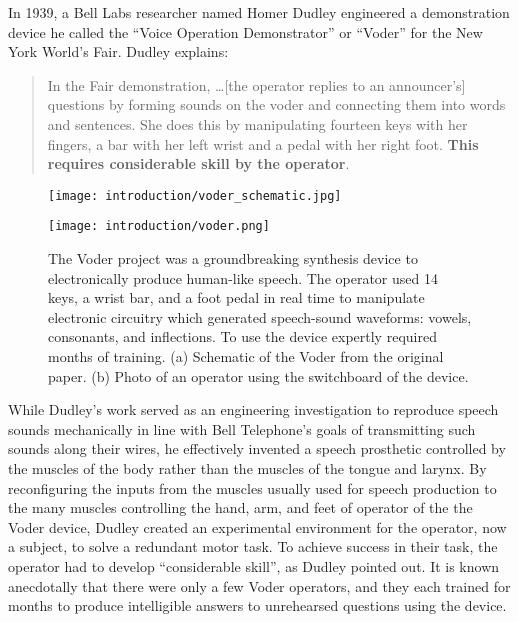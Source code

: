 \documentclass[../main.tex]{subfiles}
\begin{document}
In 1939, a Bell Labs researcher named Homer Dudley engineered a demonstration device he called the ``Voice Operation Demonstrator'' or ``Voder'' for the New York World's Fair\cite{dudleyAutomaticSynthesisSpeech1939}. Dudley explains:
%
\begin{quote}
  In the Fair demonstration, \ldots [the operator replies to an announcer's] questions by forming sounds on the voder and connecting them into words and sentences. She does this by manipulating fourteen keys with her fingers, a bar with her left wrist and a pedal with her right foot. \textbf{This requires considerable skill by the operator}.
\end{quote}
%
\begin{figure}
  \centering
  \begin{minipage}{0.59\textwidth}
    \texttt{[image: introduction/voder\_schematic.jpg]}
    \subcaption{}
  \end{minipage}
  \begin{minipage}{0.4\textwidth}
    \texttt{[image: introduction/voder.png]}
    \subcaption{}
  \end{minipage}
  \caption[The Voder at the 1939 World's Fair]{The Voder project was a groundbreaking synthesis device to electronically produce human-like speech. The operator used 14 keys, a wrist bar, and a foot pedal in real time to manipulate electronic circuitry which generated speech-sound waveforms: vowels, consonants, and inflections. To use the device expertly required months of training. (a) Schematic of the Voder from the original paper. (b) Photo of an operator using the switchboard of the device.}\label{fig:voder}
\end{figure}
%
While Dudley's work served as an engineering investigation to reproduce speech sounds mechanically in line with Bell Telephone's goals of transmitting such sounds along their wires, he effectively invented a speech prosthetic controlled by the muscles of the body rather than the muscles of the tongue and larynx. By reconfiguring the inputs from the muscles usually used for speech production to the many muscles controlling the hand, arm, and feet of operator of the the Voder device, Dudley created an experimental environment for the operator, now a subject, to solve a redundant motor task. To achieve success in their task, the operator had to develop ``considerable skill'', as Dudley pointed out. It is known anecdotally that there were only a few Voder operators, and they each trained for months to produce intelligible answers to unrehearsed questions using the device.
\end{document}
